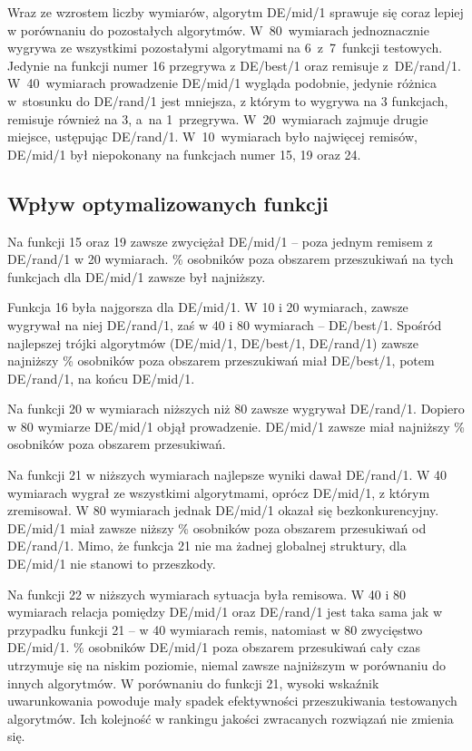 \documentclass[a4paper,onecolumn,oneside,11pt,wide,floatssmall]{mwrep}
\theoremstyle{definition}
\theoremstyle{plain}%
\theoremstyle{remark}
\begin{document}
Wraz ze wzrostem liczby wymiarów, algorytm DE/mid/1 sprawuje się coraz lepiej w porównaniu do
pozostałych algorytmów.
W~80~wymiarach jednoznacznie wygrywa ze wszystkimi pozostałymi algorytmami na 6~z~7~funkcji testowych.
Jedynie na funkcji numer 16 przegrywa z DE/best/1 oraz remisuje z~DE/rand/1.
W~40~wymiarach prowadzenie DE/mid/1 wygląda podobnie, jedynie różnica w~stosunku do DE/rand/1
jest mniejsza, z którym to wygrywa na 3 funkcjach, remisuje również na 3, a~na 1~przegrywa.
W~20~wymiarach zajmuje drugie miejsce, ustępując DE/rand/1.
W~10~wymiarach było najwięcej remisów, DE/mid/1 był niepokonany na funkcjach numer 15, 19 oraz 24.

\subsection{Wpływ optymalizowanych funkcji}

Na funkcji 15 oraz 19 zawsze zwyciężał DE/mid/1 -- poza jednym remisem z DE/rand/1 w 20 wymiarach.
\% osobników poza obszarem przeszukiwań na tych funkcjach dla DE/mid/1 zawsze był najniższy.

Funkcja 16 była najgorsza dla DE/mid/1. W 10 i 20 wymiarach, zawsze wygrywał na niej DE/rand/1,
zaś w 40 i 80 wymiarach -- DE/best/1. Spośród najlepszej trójki algorytmów (DE/mid/1, DE/best/1,
DE/rand/1) zawsze najniższy \% osobników poza obszarem przeszukiwań miał DE/best/1, 
potem DE/rand/1, na końcu DE/mid/1. 

Na funkcji 20 w wymiarach niższych niż 80 zawsze wygrywał DE/rand/1. Dopiero w 80 wymiarze DE/mid/1
objął prowadzenie. DE/mid/1 zawsze miał najniższy \% osobników poza obszarem przesukiwań.

Na funkcji 21 w niższych wymiarach najlepsze wyniki dawał DE/rand/1. W 40 wymiarach wygrał ze 
wszystkimi algorytmami, oprócz DE/mid/1, z którym zremisował. W 80 wymiarach jednak DE/mid/1
okazał się bezkonkurencyjny. DE/mid/1 miał zawsze niższy \% osobników poza obszarem przesukiwań
od DE/rand/1. Mimo, że funkcja 21 nie ma żadnej globalnej struktury, dla DE/mid/1 nie stanowi to 
przeszkody.

Na funkcji 22 w niższych wymiarach sytuacja była remisowa. 
W 40 i 80 wymiarach relacja pomiędzy DE/mid/1 oraz DE/rand/1 jest taka sama jak w przypadku funkcji 21
-- w 40 wymiarach remis, natomiast w 80 zwycięstwo DE/mid/1. \% osobników DE/mid/1 poza obszarem 
przesukiwań cały czas utrzymuje się na niskim poziomie, niemal zawsze najniższym w porównaniu do 
innych algorytmów.
W porównaniu do funkcji 21, wysoki wskaźnik uwarunkowania powoduje mały spadek efektywności
przeszukiwania testowanych algorytmów. Ich kolejność w rankingu jakości zwracanych rozwiązań nie 
zmienia się.
\end{document}
